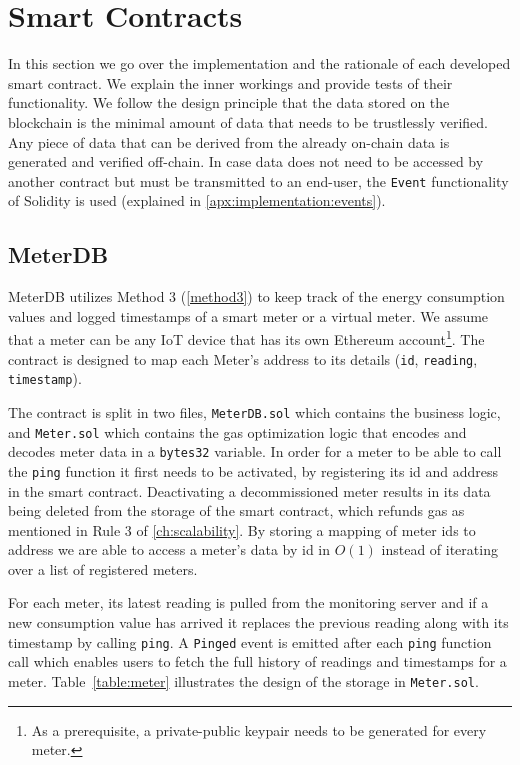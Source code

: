\section{Smart Contracts} \label{ch:implementation:sc}
In this section we go over the implementation and the rationale of each developed smart contract. We explain the inner workings and provide tests of their functionality. We follow the design principle that the data stored on the blockchain is the minimal amount of data that needs to be trustlessly verified. Any piece of data that can be derived from the already on-chain data is generated and verified off-chain. In case data does not need to be accessed by another contract but must be transmitted to an end-user, the \texttt{Event} functionality of Solidity is used (explained in \ref{apx:implementation:events}). 

\subsection{MeterDB}
MeterDB utilizes Method 3 (\ref{method3}) to keep track of the energy consumption values and logged timestamps of a smart meter or a virtual meter. We assume that a meter can be any IoT device that has its own Ethereum account\footnote{As a prerequisite, a private-public keypair needs to be generated for every meter.}. The contract is designed to map each Meter's address to its details (\texttt{id}, \texttt{reading}, \texttt{timestamp}).

The contract is split in two files, \texttt{MeterDB.sol} which contains the business logic, and \texttt{Meter.sol} which contains the gas optimization logic that encodes and decodes meter data in a \texttt{bytes32} variable. In order for a meter to be able to call the \texttt{ping} function it first needs to be activated, by registering its id and address in the smart contract. Deactivating a decommissioned meter results in its data being deleted from the storage of the smart contract, which refunds gas as mentioned in Rule 3 of \ref{ch:scalability}. By storing a mapping of meter ids to address we are able to access a meter's data by id in $O(1)$ instead of iterating over a list of registered meters.

For each meter, its latest reading is pulled from the monitoring server and if a new consumption value has arrived it replaces the previous reading along with its timestamp by calling \texttt{ping}. A \texttt{Pinged} event is emitted after each \texttt{ping} function call which enables users to fetch the full history of readings and timestamps for a meter. Table~\ref{table:meter} illustrates the design of the storage in \texttt{Meter.sol}.

